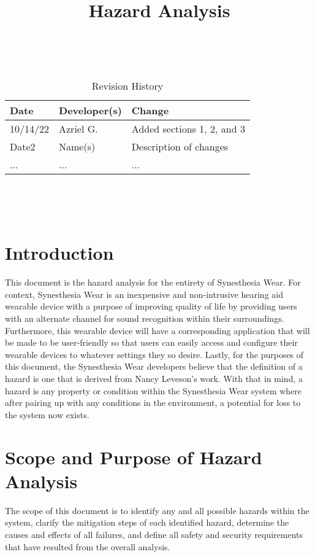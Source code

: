 \documentclass{article}
\title{Hazard Analysis\\\progname}
\author{\authname}
\date{}
\begin{document}
\maketitle
\thispagestyle{empty}

~\newpage


\begin{table}[hp]
\caption{Revision History} \label{TblRevisionHistory}
\begin{tabularx}{\textwidth}{llX}
\toprule
\textbf{Date} & \textbf{Developer(s)} & \textbf{Change}\\
\midrule
10/14/22 & Azriel G. & Added sections 1, 2, and 3\\
Date2 & Name(s) & Description of changes\\
... & ... & ...\\
\bottomrule
\end{tabularx}
\end{table}

~\newpage

\tableofcontents

~\newpage


\section{Introduction}
This document is the hazard analysis for the entirety of Synesthesia Wear.
For context, Synesthesia Wear is an inexpensive and non-intrusive hearing aid 
wearable device with a purpose of improving quality of life by providing users with 
an alternate channel for sound recognition within their surroundings. Furthermore, 
this wearable device will have a corresponding application that will be made to be 
user-friendly so that users can easily access and configure their wearable devices to 
whatever settings they so desire. Lastly, for the purposes of this document, the 
Synesthesia Wear developers believe that the definition of a hazard is one that is 
derived from Nancy Leveson's work. With that in mind, a hazard is any property or 
condition within the Synesthesia Wear system where after pairing up with any 
conditions in the environment, a potential for loss to the system now exists.

\section{Scope and Purpose of Hazard Analysis}
The scope of this document is to identify any and all possible hazards within 
the system, clarify the mitigation steps of each identified hazard, determine 
the causes and effects of all failures, and define all safety and security requirements 
that have resulted from the overall analysis.
\end{document}
